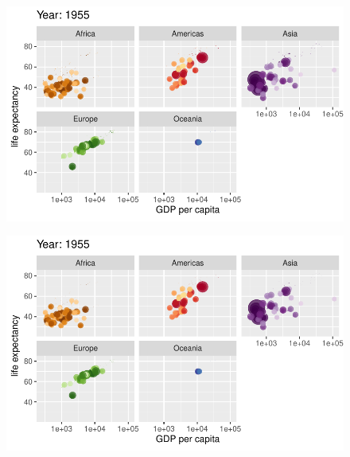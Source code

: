 \documentclass[
  letterpaper,
  DIV=11,
  numbers=noendperiod]{scrartcl}
\begin{document}
\begin{figure}[H]

{\centering \includegraphics{class05_files/figure-pdf/unnamed-chunk-24-6.pdf}

}

\end{figure}

\begin{figure}[H]

{\centering \includegraphics{class05_files/figure-pdf/unnamed-chunk-24-7.pdf}

}

\end{figure}
\end{document}
